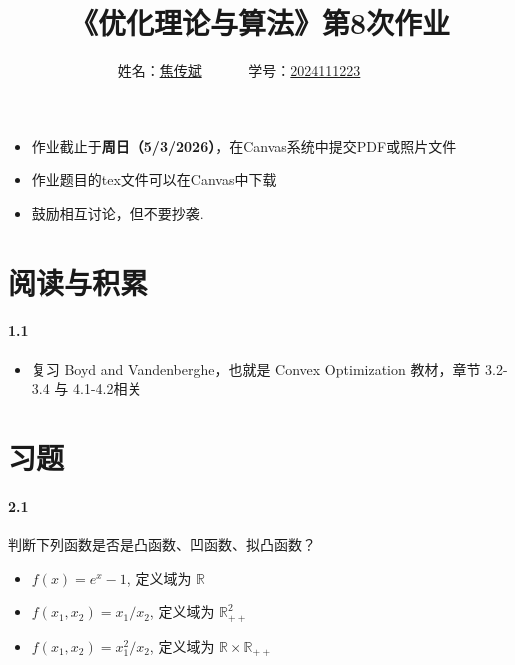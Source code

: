\documentclass[12pt,a4paper]{article}
\begin{document}
\title{
{《优化理论与算法》第8次作业
}
}
\date{}

\author{
姓名：\underline{焦传斌}~~~~~~
学号：\underline{2024111223}~~~~~~}

\maketitle
\begin{itemize}
	\item 作业截止于{\bf 周日（5/3/2026）}，在Canvas系统中提交PDF或照片文件
	\item 作业题目的tex文件可以在Canvas中下载
	\item 鼓励相互讨论，但不要抄袭.
\end{itemize}

\section{阅读与积累}
\paragraph{1.1}
\begin{itemize}
	\item 复习 Boyd and Vandenberghe，也就是 Convex Optimization 教材，章节 3.2-3.4 与 4.1-4.2相关
\end{itemize}

\section{习题}

\paragraph{2.1}
 判断下列函数是否是凸函数、凹函数、拟凸函数？
\begin{itemize}
  \item[(a)] $f(x) = e^x - 1$, 定义域为 $\mathbb{R}$
  \item[(b)] $f(x_1, x_2) = x_1 / x_2$, 定义域为 $\mathbb{R}_{++}^2$
  \item[(c)] $f(x_1, x_2) = x_1^2 / x_2$, 定义域为 $\mathbb{R} \times \mathbb{R}_{++}$
\end{itemize}
\end{document}
